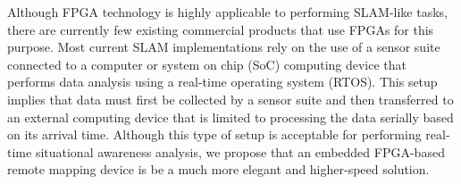 \par
Although FPGA technology is highly applicable to performing SLAM-like tasks, there are currently few existing commercial products that use FPGAs for this purpose. Most current SLAM implementations rely on the use of a sensor suite connected to a computer or system on chip (SoC) computing device that performs data analysis using a real-time operating system (RTOS). This setup implies that data must first be collected by a sensor suite and then transferred to an external computing device that is limited to processing the data serially based on its arrival time. Although this type of setup is acceptable for performing real-time situational awareness analysis, we propose that an embedded FPGA-based remote mapping device is be a much more elegant and higher-speed solution.